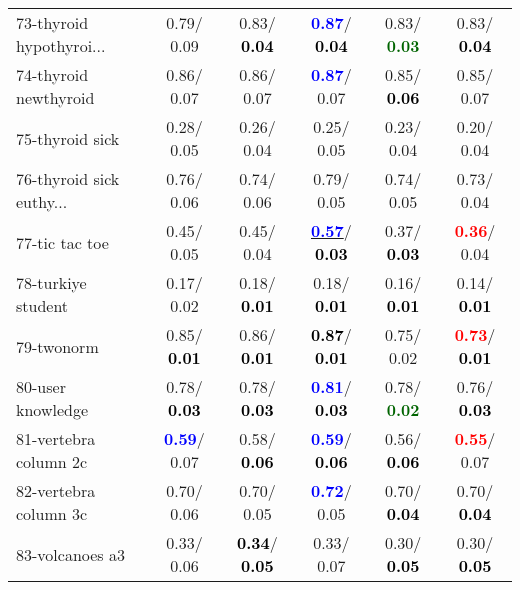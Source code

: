 \begin{table}[h]
\begin{center}
\begin{tabular}{lc|c|c|c|c}
73-thyroid hypothyroi... &   0.79/  0.09 &   0.83/\textcolor{black}{\textbf{  0.04}} & \textcolor{blue}{\textbf{  0.87}}/\textcolor{black}{\textbf{  0.04}} &   0.83/\textcolor{darkgreen}{\textbf{  0.03}} &   0.83/\textcolor{black}{\textbf{  0.04}} \\
74-thyroid newthyroid &   0.86/  0.07 &   0.86/  0.07 & \textcolor{blue}{\textbf{  0.87}}/  0.07 &   0.85/\textcolor{black}{\textbf{  0.06}} &   0.85/  0.07 \\
75-thyroid sick &   0.28/  0.05 &   0.26/  0.04 &   0.25/  0.05 &   0.23/  0.04 &   0.20/  0.04 \\
76-thyroid sick euthy... &   0.76/  0.06 &   0.74/  0.06 &   0.79/  0.05 &   0.74/  0.05 &   0.73/  0.04 \\
77-tic tac toe &   0.45/  0.05 &   0.45/  0.04 & \underline{\textcolor{blue}{\textbf{  0.57}}}/\textcolor{black}{\textbf{  0.03}} &   0.37/\textcolor{black}{\textbf{  0.03}} & \textcolor{red}{\textbf{  0.36}}/  0.04 \\
78-turkiye student &   0.17/  0.02 &   0.18/\textcolor{black}{\textbf{  0.01}} &   0.18/\textcolor{black}{\textbf{  0.01}} &   0.16/\textcolor{black}{\textbf{  0.01}} &   0.14/\textcolor{black}{\textbf{  0.01}} \\ \hline
79-twonorm &   0.85/\textcolor{black}{\textbf{  0.01}} &   0.86/\textcolor{black}{\textbf{  0.01}} & \textcolor{black}{\textbf{  0.87}}/\textcolor{black}{\textbf{  0.01}} &   0.75/  0.02 & \textcolor{red}{\textbf{  0.73}}/\textcolor{black}{\textbf{  0.01}} \\
80-user knowledge &   0.78/\textcolor{black}{\textbf{  0.03}} &   0.78/\textcolor{black}{\textbf{  0.03}} & \textcolor{blue}{\textbf{  0.81}}/\textcolor{black}{\textbf{  0.03}} &   0.78/\textcolor{darkgreen}{\textbf{  0.02}} &   0.76/\textcolor{black}{\textbf{  0.03}} \\
81-vertebra column 2c & \textcolor{blue}{\textbf{  0.59}}/  0.07 &   0.58/\textcolor{black}{\textbf{  0.06}} & \textcolor{blue}{\textbf{  0.59}}/\textcolor{black}{\textbf{  0.06}} &   0.56/\textcolor{black}{\textbf{  0.06}} & \textcolor{red}{\textbf{  0.55}}/  0.07 \\
82-vertebra column 3c &   0.70/  0.06 &   0.70/  0.05 & \textcolor{blue}{\textbf{  0.72}}/  0.05 &   0.70/\textcolor{black}{\textbf{  0.04}} &   0.70/\textcolor{black}{\textbf{  0.04}} \\
83-volcanoes a3 &   0.33/  0.06 & \textcolor{black}{\textbf{  0.34}}/\textcolor{black}{\textbf{  0.05}} &   0.33/  0.07 &   0.30/\textcolor{black}{\textbf{  0.05}} &   0.30/\textcolor{black}{\textbf{  0.05}} \\

\end{tabular}
\end{center}
\end{table}
